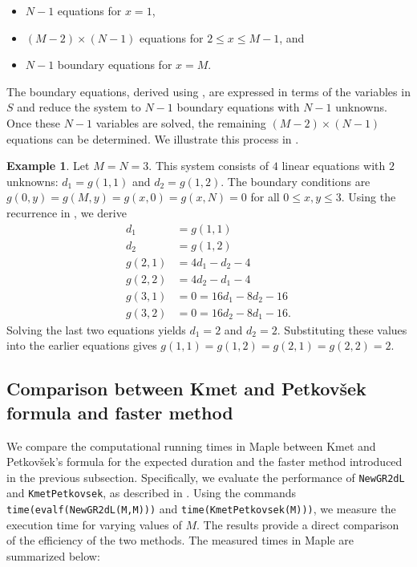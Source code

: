 \documentclass[reqno]{amsart}
\theoremstyle{definition}
\newtheorem{example}{Example}
\theoremstyle{definition}
\theoremstyle{remark}
\begin{document}
\begin{itemize}[leftmargin=0.2 in]
    \item $N-1$ equations for $x=1$,
    \item $(M-2)\times(N-1)$ equations for $2\leq x\leq M-1$, and
    \item $N-1$ boundary equations for $x=M$.
\end{itemize}

The boundary equations, derived using , are expressed in terms of the variables in $S$ and reduce the system to $N-1$ boundary equations with $N-1$ unknowns. Once these $N-1$ variables are solved, the remaining $(M-2)\times(N-1)$ equations can be determined. We illustrate this process in .


\begin{example}\label{ex:new approach}
Let $M=N=3$. This system consists of $4$ linear equations with $2$ unknowns: $d_1=g(1,1)$ and $d_2=g(1,2)$. The boundary conditions are $g(0,y)=g(M,y)=g(x,0)=g(x,N)=0$ for all $0\leq x,y\leq 3$. Using the recurrence in , we derive
\begin{align*}
    d_1&=g(1,1)\\
    d_2&=g(1,2)\\
    g(2,1)&=4d_1-d_2-4\\
    g(2,2)&=4d_2-d_1-4\\
    g(3,1)&=0=16d_1-8d_2-16\\
    g(3,2)&=0=16d_2-8d_1-16.
\end{align*}
Solving the last two equations yields $d_1=2$ and $d_2=2$. Substituting these values into the earlier equations gives $g(1,1)=g(1,2)=g(2,1)=g(2,2)=2$.
\end{example}


\subsection{Comparison between Kmet and Petkov\v{s}ek formula and faster method}\label{subsec:time comparison in 2d}
We compare the computational running times in Maple between Kmet and Petkov\v{s}ek's formula for the expected duration and the faster method introduced in the previous subsection. Specifically, we evaluate the performance of \lstinline{NewGR2dL} and \lstinline{KmetPetkovsek},  as described in . Using the commands \lstinline{time(evalf(NewGR2dL(M,M)))} and \lstinline{time(KmetPetkovsek(M)))}, we measure the execution time for varying values of $M$. The results provide a direct comparison of the efficiency of the two methods. The measured times in Maple are summarized below:
\end{document}
